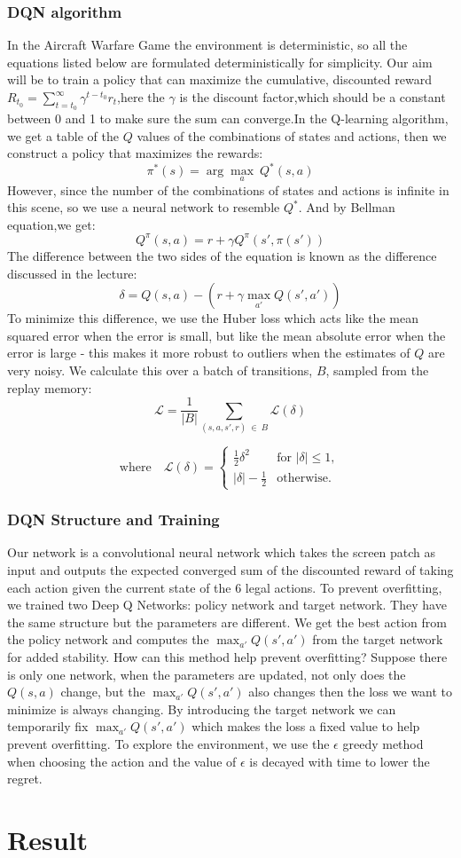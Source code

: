 \documentclass{article}
\begin{document}
    \subsubsection{DQN algorithm} In the Aircraft Warfare Game the environment is deterministic, so all the equations listed below are formulated deterministically for simplicity. Our aim will be to train a policy that can maximize the cumulative, discounted reward $R_{t_0} = \sum_{t=t_0}^{\infty} {\gamma}^{t-t_0}r_t$,here the $\gamma$ is the discount factor,which should be a constant between 0 and 1 to make sure the sum can converge.In the Q-learning algorithm, we get a table of the $Q$ values of the combinations of states and actions, then we construct a policy that maximizes the rewards:
    $$\pi^*(s) = \arg\!\max_a \ Q^*(s, a)$$
    However, since the number of the combinations of states and actions is infinite in this scene, so we use a neural network to resemble $Q^*$. And by Bellman equation,we get:
    $$Q^{\pi}(s, a) = r + \gamma Q^{\pi}(s', \pi(s'))$$
    The difference between the two sides of the equation is known as the difference discussed in the lecture:
    $$\delta = Q(s, a) - (r + \gamma \max_{a'} Q(s', a'))$$
    To minimize this difference, we use the Huber loss which acts
    like the mean squared error when the error is small, but like the mean
    absolute error when the error is large - this makes it more robust to
    outliers when the estimates of $Q$ are very noisy. We calculate
    this over a batch of transitions, $B$, sampled from the replay
    memory:
    $$\mathcal{L} = \frac{1}{|B|}\sum_{(s, a, s', r) \ \in \ B} \mathcal{L}(\delta)$$
    
    $$\text{where} \quad \mathcal{L}(\delta) = \begin{cases}
         \frac{1}{2}{\delta^2}  & \text{for } |\delta| \le 1, \\
         |\delta| - \frac{1}{2} & \text{otherwise.}
       \end{cases}$$
    \subsubsection{DQN Structure and Training}
    Our network is a convolutional neural network which takes the screen patch as input and outputs the expected converged sum of the discounted reward of taking each action given the current state of the 6 legal actions. To prevent overfitting, we trained two Deep Q Networks: policy network and target network. They have the same structure but the parameters are different. We get the best action from the policy network and computes the $\max_{a'} Q(s', a')$ from the target network for added stability. How can this method help prevent overfitting? Suppose there is only one network, when the parameters are updated, not only does the $Q(s, a)$ change, but the $\max_{a'} Q(s', a')$ also changes then the loss we want to minimize is always changing. By introducing the target network we can temporarily fix $\max_{a'} Q(s', a')$ which makes the loss a fixed value to help prevent overfitting. To explore the environment, we use the $\epsilon$ greedy method when choosing the action and the value of $\epsilon$ is decayed with time to lower the regret.
\section{Result}

\appendix
\end{document}
